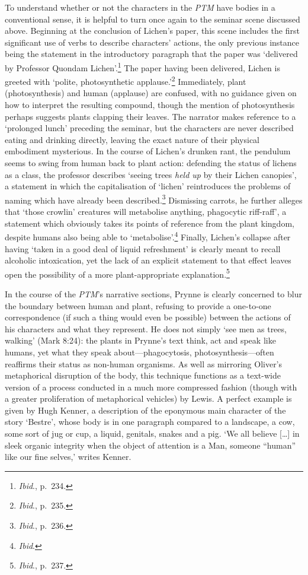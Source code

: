 \documentclass[]{article}
\begin{document}
To understand whether or not the characters in the \emph{PTM} have
bodies in a conventional sense, it is helpful to turn once again to the
seminar scene discussed above. Beginning at the conclusion of Lichen's
paper, this scene includes the first significant use of verbs to
describe characters' actions, the only previous instance being the
statement in the introductory paragraph that the paper was `delivered by
Professor Quondam Lichen'.\footnote{\emph{Ibid}., p.~234.} The paper
having been delivered, Lichen is greeted with `polite, photosynthetic
applause.'\footnote{\emph{Ibid}., p.~235.} Immediately, plant
(photosynthesis) and human (applause) are confused, with no guidance
given on how to interpret the resulting compound, though the mention of
photosynthesis perhaps suggests plants clapping their leaves. The
narrator makes reference to a `prolonged lunch' preceding the seminar,
but the characters are never described eating and drinking directly,
leaving the exact nature of their physical embodiment mysterious. In the
course of Lichen's drunken rant, the pendulum seems to swing from human
back to plant action: defending the status of lichens as a class, the
professor describes `seeing trees \emph{held up} by their Lichen
canopies', a statement in which the capitalisation of `lichen'
reintroduces the problems of naming which have already been
described.\footnote{\emph{Ibid}., p.~236.} Dismissing carrots, he
further alleges that `those crowlin' creatures will metabolise anything,
phagocytic riff-raff', a statement which obviously takes its points of
reference from the plant kingdom, despite humans also being able to
`metabolise'.\footnote{\emph{Ibid}.} Finally, Lichen's collapse after
having `taken in a good deal of liquid refreshment' is clearly meant to
recall alcoholic intoxication, yet the lack of an explicit statement to
that effect leaves open the possibility of a more plant-appropriate
explanation.\footnote{\emph{Ibid}., p.~237.}

In the course of the \emph{PTM}'s narrative sections, Prynne is clearly
concerned to blur the boundary between human and plant, refusing to
provide a one-to-one correspondence (if such a thing would even be
possible) between the actions of his characters and what they represent.
He does not simply `see men as trees, walking' (Mark 8:24): the plants
in Prynne's text think, act and speak like humans, yet what they speak
about---phagocytosis, photosynthesis---often reaffirms their status as
non-human organisms. As well as mirroring Oliver's metaphorical
disruption of the body, this technique functions as a text-wide version
of a process conducted in a much more compressed fashion (though with a
greater proliferation of metaphorical vehicles) by Lewis. A perfect
example is given by Hugh Kenner, a description of the eponymous main
character of the story `Bestre', whose body is in one paragraph compared
to a landscape, a cow, some sort of jug or cup, a liquid, genitals,
snakes and a pig. `We all believe {[}\ldots{}{]} in sleek organic
integrity when the object of attention is a Man, someone ``human'' like
our fine selves,' writes Kenner.
\end{document}

